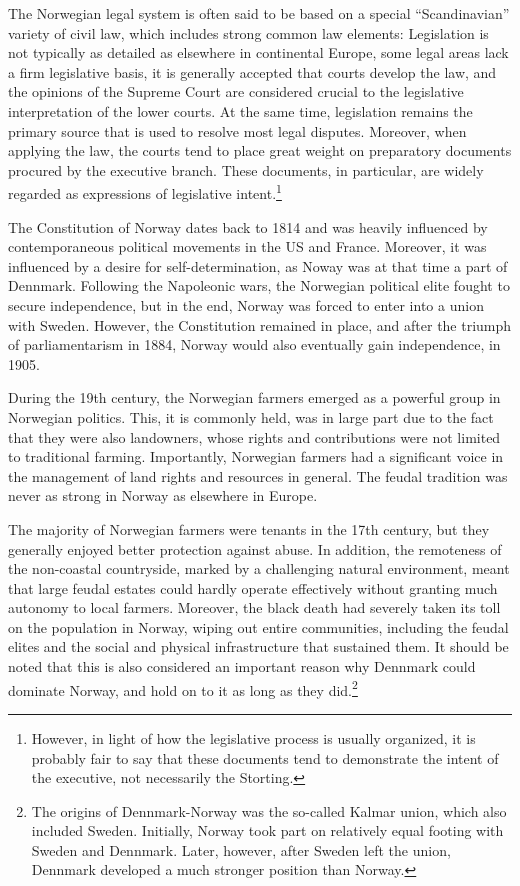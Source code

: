 The Norwegian legal system is often said to be based on a special ``Scandinavian'' variety of civil law, which includes strong common law elements: Legislation is not typically as detailed as elsewhere in continental Europe, some legal areas lack a firm legislative basis,  it is generally accepted that courts develop the law, and the opinions of the Supreme Court are considered crucial to the legislative interpretation of the lower courts. At the same time, legislation remains the primary source that is used to resolve most legal disputes. Moreover, when applying the law, the courts tend to place great weight on preparatory documents procured by the executive branch. These documents, in particular, are widely regarded as expressions of legislative intent.\footnote{However, in light of how the legislative process is usually organized, it is probably fair to say that these documents tend to demonstrate the intent of the executive, not necessarily the Storting.}

The Constitution of Norway dates back to 1814 and was heavily influenced by contemporaneous political movements in the US and France. Moreover, it was influenced by a desire for self-determination, as Noway was at that time a part of Dennmark. Following the Napoleonic wars, the Norwegian political elite fought to secure independence, but in the end, Norway was forced to enter into a union with Sweden. However, the Constitution remained in place, and after the triumph of parliamentarism in 1884, Norway would also eventually gain independence, in 1905.

During the 19th century, the Norwegian farmers emerged as a powerful group in Norwegian politics. This, it is commonly held, was in large part due to the fact that they were also landowners, whose rights and contributions were not limited to traditional farming. Importantly, Norwegian farmers had a significant voice in the management of land rights and resources in general. The feudal tradition was never as strong in Norway as elsewhere in Europe. 

The majority of Norwegian farmers were tenants in the 17th century, but they generally enjoyed better protection against abuse. In addition, the remoteness of the non-coastal countryside, marked by a challenging natural environment, meant that large feudal estates could hardly operate effectively without granting much autonomy to local farmers. Moreover, the black death had severely taken its toll on the population in Norway, wiping out entire communities, including the feudal elites and the social and physical infrastructure that sustained them. It should be noted that this is also considered an important reason why Dennmark could dominate Norway, and hold on to it as long as they did.\footnote{The origins of Dennmark-Norway was the so-called Kalmar union, which also included Sweden. Initially, Norway took part on relatively equal footing with Sweden and Dennmark. Later, however, after Sweden left the union, Dennmark developed a much stronger position than Norway.}

